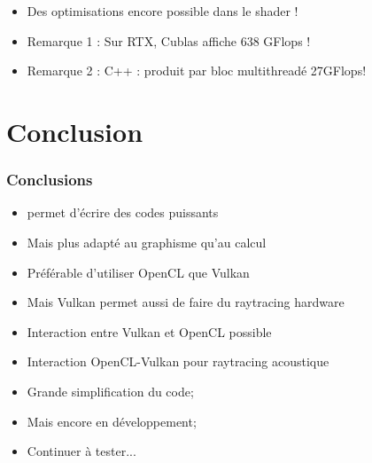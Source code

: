 \documentclass{beamer}
\begin{document}
\begin{frame}[fragile]
\begin{itemize}
\item \alert{Des optimisations encore possible dans le shader !}
\item \textcolor{NavyBlue}{Remarque 1} : Sur RTX, Cublas affiche 638 GFlops !
\item \textcolor{NavyBlue}{Remarque 2} : C++ : produit par bloc multithreadé 27GFlops!
\end{itemize}
\end{frame}

\section{Conclusion}

\begin{frame}[fragile]
\frametitle{Conclusions}

\makeatletter
\def\@shadowbox#1{%
  \setbox\@fancybox\hbox{\fcolorbox{black}{cyan!15}{#1}}%
  \leavevmode\vbox{%
    \offinterlineskip
    \dimen@=\shadowsize
    \advance\dimen@ .5\fboxrule
    \hbox{\copy\@fancybox\kern-.5\fboxrule\lower\shadowsize\hbox{%
      \vrule \@height\ht\@fancybox \@depth\dp\@fancybox \@width\dimen@}}%
    \vskip-\dimen@
    \moveright\shadowsize\vbox{%
      \hrule \@width\wd\@fancybox \@height\dimen@}}}
\makeatother

\begin{itemize}
\item permet d'écrire des codes puissants
\item Mais plus adapté au graphisme qu'au calcul
\item Préférable d'utiliser OpenCL que Vulkan 
\item Mais Vulkan permet aussi de faire du raytracing hardware
\item Interaction entre Vulkan et OpenCL possible
\item Interaction OpenCL-Vulkan pour raytracing acoustique
\end{itemize}

\begin{itemize}
\item Grande simplification du code;
\item Mais encore en développement;
\item Continuer à tester...
\end{itemize}
\end{frame}
\end{document}
